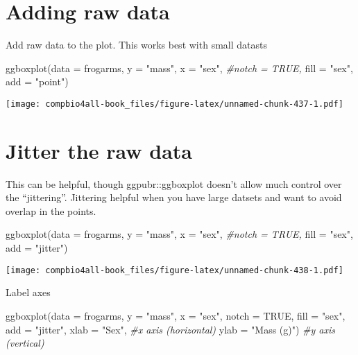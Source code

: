 \documentclass[
]{book}
\newenvironment{Shaded}{\begin{snugshade}}{\end{snugshade}}
\newcommand{\AttributeTok}[1]{\textcolor[rgb]{0.77,0.63,0.00}{#1}}
\newcommand{\CommentTok}[1]{\textcolor[rgb]{0.56,0.35,0.01}{\textit{#1}}}
\newcommand{\ConstantTok}[1]{\textcolor[rgb]{0.00,0.00,0.00}{#1}}
\newcommand{\FunctionTok}[1]{\textcolor[rgb]{0.00,0.00,0.00}{#1}}
\newcommand{\NormalTok}[1]{#1}
\newcommand{\StringTok}[1]{\textcolor[rgb]{0.31,0.60,0.02}{#1}}
\begin{document}
\hypertarget{adding-raw-data}{%
\section{Adding raw data}\label{adding-raw-data}}

Add raw data to the plot. This works best with small datasts

\begin{Shaded}
\begin{Highlighting}[]
\FunctionTok{ggboxplot}\NormalTok{(}\AttributeTok{data =}\NormalTok{ frogarms,}
          \AttributeTok{y =} \StringTok{"mass"}\NormalTok{,}
          \AttributeTok{x =} \StringTok{"sex"}\NormalTok{,}
          \CommentTok{\#notch  = TRUE,}
          \AttributeTok{fill =} \StringTok{"sex"}\NormalTok{,}
          \AttributeTok{add =} \StringTok{"point"}\NormalTok{)}
\end{Highlighting}
\end{Shaded}

\texttt{[image: compbio4all-book\_files/figure-latex/unnamed-chunk-437-1.pdf]}

\hypertarget{jitter-the-raw-data}{%
\section{Jitter the raw data}\label{jitter-the-raw-data}}

This can be helpful, though ggpubr::ggboxplot doesn't allow much control over the ``jittering''. Jittering helpful when you have large datsets and want to avoid overlap in the points.

\begin{Shaded}
\begin{Highlighting}[]
\FunctionTok{ggboxplot}\NormalTok{(}\AttributeTok{data =}\NormalTok{ frogarms,}
          \AttributeTok{y =} \StringTok{"mass"}\NormalTok{,}
          \AttributeTok{x =} \StringTok{"sex"}\NormalTok{,}
          \CommentTok{\#notch  = TRUE,}
          \AttributeTok{fill =} \StringTok{"sex"}\NormalTok{,}
          \AttributeTok{add =} \StringTok{"jitter"}\NormalTok{)}
\end{Highlighting}
\end{Shaded}

\texttt{[image: compbio4all-book\_files/figure-latex/unnamed-chunk-438-1.pdf]}

Label axes

\begin{Shaded}
\begin{Highlighting}[]
\FunctionTok{ggboxplot}\NormalTok{(}\AttributeTok{data =}\NormalTok{ frogarms,}
          \AttributeTok{y =} \StringTok{"mass"}\NormalTok{,}
          \AttributeTok{x =} \StringTok{"sex"}\NormalTok{,}
          \AttributeTok{notch  =} \ConstantTok{TRUE}\NormalTok{,}
          \AttributeTok{fill =} \StringTok{"sex"}\NormalTok{,}
          \AttributeTok{add =} \StringTok{"jitter"}\NormalTok{,}
          \AttributeTok{xlab =} \StringTok{"Sex"}\NormalTok{,      }\CommentTok{\#x axis (horizontal)}
          \AttributeTok{ylab =} \StringTok{"Mass (g)"}\NormalTok{) }\CommentTok{\#y axis (vertical)}
\end{Highlighting}
\end{Shaded}
\end{document}
